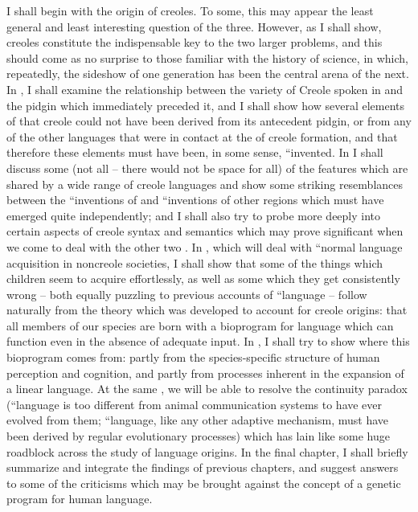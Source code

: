 I shall begin with the origin of creoles. To some, this may appear the least general and least interesting question of the three. However, as I shall show, creoles constitute the indispensable key to the two larger problems, and this should come as no surprise to those familiar with the history of science, in which, repeatedly, the sideshow of one generation has been the central arena of the next. In , I shall examine the relationship between the variety of Creole  spoken in  and the pidgin which immediately preceded it, and I shall show how several elements of that creole could not have been derived from its antecedent pidgin, or from any of the other languages that were in contact at the  of creole formation, and that therefore these elements must have been, in some sense, ``invented. In  I shall discuss some (not all -- there would not be space for all) of the features which are shared by a wide range of creole languages and show some striking resemblances between the ``inventions of  and ``inventions of other regions which must have emerged quite independently; and I shall also try to probe more deeply into certain aspects of creole syntax and semantics which may prove signifi\-cant when we come to deal with the other two . In , which will deal with ``normal language acquisition in noncreole societies, I shall show that some of the things which children seem to acquire effortlessly, as well as some which they get consistently wrong -- both equally puzzling to previous accounts of ``language  -- follow naturally from the theory which was developed to account for creole origins: that all members of our species are born with a bio\-program for language which can function even in the absence of ade\-quate input. In , I shall try to show where this bioprogram comes from: partly from the species-specific structure of human perception and cognition, and partly from processes inherent in the expansion of a linear language. At the same , we will be able to resolve the continuity paradox (``language is too different from animal communication systems to have ever evolved from them{\textquotedbl}; ``language, like any other adaptive mechanism, must have been derived by regular evolutionary processes{\textquotedbl}) which has lain like some huge roadblock across the study of language origins. In the final chapter, I shall briefly summarize and integrate the findings of previous chapters, and suggest answers to some of the criticisms which may be brought against the concept of a genetic program for human language.
